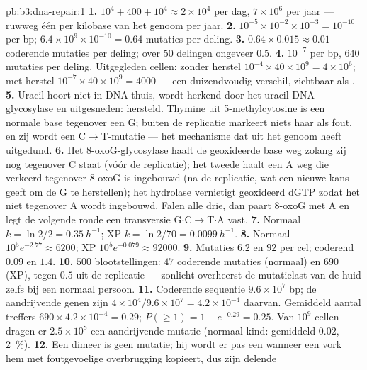 \begin{solution}{pb:b3:dna-repair:1}
\textbf{1.} $10^{4} + 400 + 10^{4} \approx 2\times 10^{4}$  per
dag, $7\times 10^{6}$ per jaar --- ruwweg één per kilobase van het
genoom per jaar.
\textbf{2.} $10^{-5}\times 10^{-2}\times 10^{-3} = 10^{-10}$ per bp;
$6.4\times 10^{9}\times 10^{-10} = 0.64$ mutaties per deling.
\textbf{3.} $0.64\times 0.015 \approx 0.01$ coderende mutaties per
deling; over $50$ delingen ongeveer $0.5$.
\textbf{4.} $10^{-7}$ per bp, $640$ mutaties per deling. Uitgegleden
cellen: zonder herstel $10^{-4}\times 40\times 10^{9} = 4\times 10^{6}$;
met herstel $10^{-7}\times 40\times 10^{9} = 4000$ --- een duizendvoudig
verschil, zichtbaar als .
\textbf{5.} Uracil hoort niet in DNA thuis, wordt herkend door het
uracil-DNA-glycosylase en uitgesneden: hersteld. Thymine uit
5-methylcytosine is een normale base tegenover een G; buiten de
replicatie markeert niets haar als fout, en zij wordt een
C$\to$T-mutatie --- het mechanisme dat  uit het genoom heeft
uitgedund.
\textbf{6.} Het 8-oxoG-glycosylase haalt de geoxideerde base weg zolang
zij nog tegenover C staat (vóór de replicatie); het tweede 
haalt een A weg die verkeerd tegenover 8-oxoG is ingebouwd (na de
replicatie, wat een nieuwe kans geeft om de G te herstellen); het
hydrolase vernietigt geoxideerd dGTP zodat het niet tegenover A wordt
ingebouwd. Falen alle drie, dan paart 8-oxoG met A en legt de volgende
ronde een transversie G$\cdot$C$\to$T$\cdot$A vast.
\textbf{7.} Normaal $k = \ln 2/2 = \qty{0.35}{h^{-1}}$; XP $k = \ln 2/70
= \qty{0.0099}{h^{-1}}$.
\textbf{8.} Normaal $10^{5} e^{-2.77} \approx 6200$; XP $10^{5}
e^{-0.079} \approx \num{92000}$.
\textbf{9.} Mutaties $6.2$ en $92$ per cel; coderend $0.09$ en $1.4$.
\textbf{10.} $500$ blootstellingen: $47$ coderende mutaties (normaal) en
$690$ (XP), tegen $0.5$ uit de replicatie --- zonlicht overheerst de
mutatielast van de huid zelfs bij een normaal persoon.
\textbf{11.} Coderende sequentie $9.6\times 10^{7}$ bp; de
aandrijvende genen zijn $4\times 10^{4}/9.6\times 10^{7} = 4.2\times 10^{-4}$
daarvan. Gemiddeld aantal treffers $690\times 4.2\times 10^{-4} = 0.29$;
$P(\ge 1) = 1 - e^{-0.29} =
0.25$. Van $10^{9}$ cellen dragen er $2.5\times 10^{8}$ een
aandrijvende mutatie (normaal kind: gemiddeld $0.02$, \qty{2}{\%}).
\textbf{12.} Een dimeer is geen mutatie; hij wordt er pas een wanneer
een vork hem met foutgevoelige overbrugging kopieert, dus zijn delende

\end{solution}
